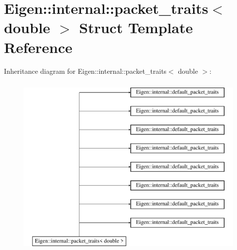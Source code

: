 \hypertarget{struct_eigen_1_1internal_1_1packet__traits_3_01double_01_4}{}\section{Eigen\+:\+:internal\+:\+:packet\+\_\+traits$<$ double $>$ Struct Template Reference}
\label{struct_eigen_1_1internal_1_1packet__traits_3_01double_01_4}
Inheritance diagram for Eigen\+:\+:internal\+:\+:packet\+\_\+traits$<$ double $>$\+:\begin{figure}[H]
\begin{center}
\leavevmode
\includegraphics[height=9.000000cm]{struct_eigen_1_1internal_1_1packet__traits_3_01double_01_4}
\end{center}
\end{figure}

